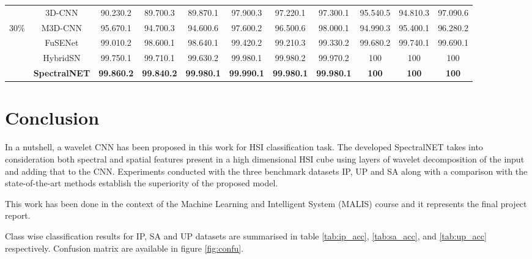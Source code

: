 \documentclass[journal]{IEEEtran}
\begin{document}
\begin{table*}
{\begin{tabular}{c | c | c c c | c c c | c c c}
         & 3D-CNN & 90.230.2 & 89.700.3 & 89.870.1 & 97.900.3 & 97.220.1 & 97.300.1 & 95.540.5 & 94.810.3 & 97.090.6 \\
         
        30\% & M3D-CNN & 95.670.1 & 94.700.3 & 94.600.6 & 97.600.2 & 96.500.6 & 98.000.1 & 94.990.3 & 95.400.1 & 96.280.2 \\
         
         & FuSENet & 99.010.2 & 98.600.1 & 98.640.1 & 99.420.2 & 99.210.3 & 99.330.2 & 99.680.2 & 99.740.1 & 99.690.1 \\
         
         & HybridSN & 99.750.1 & 99.710.1 & 99.630.2 & 99.980.1 & 99.980.2 & 99.970.2 & 100 & 100 & 100 \\
         
         & \textbf{SpectralNET} & \textbf{99.860.2} & \textbf{99.840.2} & \textbf{99.980.1} & \textbf{99.990.1} & \textbf{99.980.1} & \textbf{99.980.1} & \textbf{100} & \textbf{100} & \textbf{100}\\
         
         \hline
         \hline        
        \end{tabular}}
\end{table*}

\section{Conclusion}
In a nutshell, a wavelet CNN has been proposed in this work for HSI classification task. The developed SpectralNET takes into consideration both spectral and spatial features present in a high dimensional HSI cube using layers of wavelet decomposition of the input and adding that to the CNN. Experiments conducted with the three benchmark datasets IP, UP and SA along with a comparison with the state-of-the-art methods establish the superiority of the proposed model.

This work has been done in the context of the Machine Learning and Intelligent System (MALIS) course and it represents the final project report.





\clearpage


Class wise classification results for IP, SA and UP datasets are summarised in table \ref{tab:ip_acc}, \ref{tab:sa_acc}, and \ref{tab:up_acc}  respectively. Confusion matrix are available in figure \ref{fig:confu}.
\end{document}
